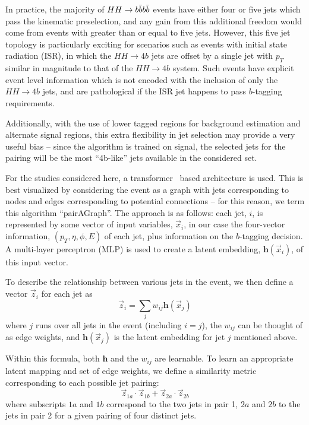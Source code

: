 In practice, the majority of $HH\rightarrow b\bar{b}b\bar{b}$ events have either four or five jets which pass 
the kinematic preselection, and any gain from this additional freedom would come from events with 
greater than or equal to five jets. However, this five jet topology is particularly exciting 
for scenarios such as events with initial state radiation (ISR), in which the $HH\rightarrow 4b$ jets are offset by 
a single jet with $p_{T}$ similar in magnitude to that of the $HH\rightarrow 4b$ system. Such events have explicit 
event level information which is not encoded with the inclusion of only the $HH\rightarrow 4b$ jets, and are 
pathological if the ISR jet happens to pass $b$-tagging requirements.

Additionally, with the use of lower tagged regions for background estimation and alternate 
signal regions, this extra flexibility in jet selection may provide a very useful bias -- 
since the algorithm is trained on signal, the selected jets for the pairing will be the 
most ``4b-like'' jets available in the considered set.

For the studies considered here, a transformer~\cite{Transformers} based architecture is used. This is 
best visualized by considering the event as a graph with jets corresponding to nodes and 
edges corresponding to potential connections -- for this reason, we term this algorithm ``pairAGraph''.
The approach is as follows: each jet, $i$, is represented by some vector of input variables, 
$\vec{x}_i$, in our case the four-vector information, $(p_{T}, \eta, \phi, E)$ of each jet, plus 
information on the $b$-tagging decision. A multi-layer perceptron (MLP) is used to create a latent 
embedding, $\mathbf{h}(\vec{x}_i)$, of this input vector.

To describe the relationship between various jets in the event, we then define a vector $\vec{z}_{i}$ 
for each jet as 
\begin{equation}
\vec{z}_i = \sum\limits_j w_{ij}\mathbf{h}(\vec{x}_j)
\end{equation}
where $j$ runs over all jets in the event (including $i=j$), the $w_{ij}$ can be thought of as 
edge weights, and $\mathbf{h}(\vec{x}_j)$ is the latent embedding for jet $j$ mentioned above.

Within this formula, both $\mathbf{h}$ and the $w_{ij}$ are learnable. To learn an appropriate 
latent mapping and set of edge weights, we define a similarity metric corresponding to each 
possible jet pairing:
\begin{equation}
\vec{z}_{1a}\cdot \vec{z}_{1b} + \vec{z}_{2a}\cdot \vec{z}_{2b}
\end{equation}
where subscripts $1a$ and $1b$ correspond to the two jets in pair 1, $2a$ and $2b$ to 
the jets in pair 2 for a given pairing of four distinct jets.

